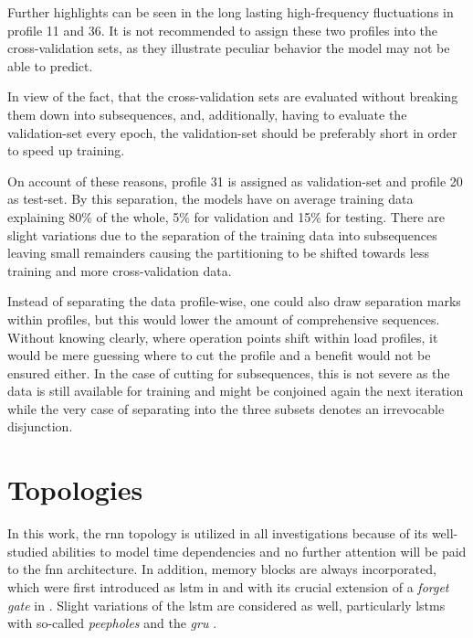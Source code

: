 Further highlights can be seen in the long lasting high-frequency fluctuations in profile 11 and 36.
It is not recommended to assign these two profiles into the cross-validation sets, as they illustrate peculiar behavior the model may not be able to predict.

In view of the fact, that the cross-validation sets are evaluated without breaking them down into subsequences, and, additionally, having to evaluate the validation-set every epoch, the validation-set should be preferably short in order to speed up training.

On account of these reasons, profile 31 is assigned as validation-set and profile 20 as test-set.
By this separation, the models have on average training data explaining 80\% of the whole, 5\% for validation and 15\% for testing.
There are slight variations due to the separation of the training data into subsequences leaving small remainders causing the partitioning to be shifted towards less training and more cross-validation data.

Instead of separating the data profile-wise, one could also draw separation marks within profiles, but this would lower the amount of comprehensive sequences.
Without knowing clearly, where operation points shift within load profiles, it would be mere guessing where to cut the profile and a benefit would not be ensured either.
In the case of cutting for subsequences, this is not severe as the data is still available for training and might be conjoined again the next iteration while  the very case of separating into the three subsets denotes an irrevocable disjunction.

\section{Topologies}
\label{sec:arch}
In this work, the \gls{rnn} topology is utilized in all investigations because of its well-studied abilities to model time dependencies and no further attention will be paid to the \gls{fnn} architecture.
In addition, memory blocks are always incorporated, which were first introduced as \gls{lstm} in \cite{HoSch1997} and with its crucial extension of a \textit{forget gate} in \cite{GeSch1999}.
Slight variations of the \gls{lstm} are considered as well, particularly \glspl{lstm} with so-called \textit{peepholes} \cite{GeSch2000} and the \textit{\gls{gru}} \cite{ChoMe2014}.

